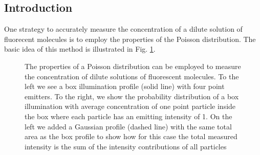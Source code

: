 \documentclass[%
 reprint,
 amsmath,amssymb,
 aps,
]{revtex4-1}
\begin{document}
\subsection{Introduction}
One strategy to accurately measure the concentration of a dilute solution of fluorecent molecules is to employ the properties of the Poisson distribution.  The basic idea of this method is illustrated in Fig. \ref{fig:poissonconc}.  
\begin{figure}[H]
\begin{center}
\caption{The properties of a Poisson distribution can be employed to measure the concentration of dilute solutions of fluorescent molecules.  To the left we see a box illumination profile (solid line) with four point emitters.  To the right, we show the probability distribution of a box illumination with average concentration of one point particle inside the box where each particle has an emitting intensity of 1.  On the left we added a Gaussian profile (dashed line) with the same total area as the box profile to show how for this case the total measured intensity is the sum of the intensity contributions of all particles}\label{fig:poissonconc}
\end{center}
\end{figure}
\end{document}
